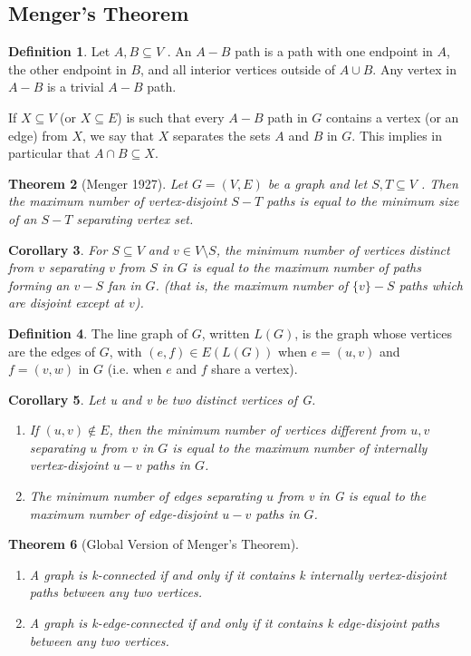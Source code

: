 \documentclass[11pt, fleqn, a4paper, landscape]{article}
\theoremstyle{plain} %
\newtheorem{thm}{Theorem}
\newtheorem{cor}[thm]{Corollary}
\theoremstyle{remark} %
\theoremstyle{definition} %
\newtheorem{defi}[thm]{Definition}
\begin{document}
\begin{multicols}{3}
\subsection{Menger’s Theorem}

\begin{defi}
Let $A,B \subseteq V$ . An $A-B$ path is a path with one endpoint in $A$, the other endpoint in $B$, and all interior vertices outside of $A \cup B$. Any vertex in $A - B$ is a trivial $A-B$ path.

If $X \subseteq V$ (or $X \subseteq E$) is such that every $A-B$ path in $G$ contains a vertex (or an edge) from $X$, we say that $X$ separates the sets $A$ and $B$ in $G$. This implies in particular that $A \cap B \subseteq X$.
\end{defi}
\begin{thm}[Menger 1927]
Let $G = (V,E)$ be a graph and let $S, T \subseteq V$ . Then the maximum
number of vertex-disjoint $S-T$ paths is equal to the minimum size of an $S-T$ separating vertex set.
\end{thm}

\begin{cor}
For $S \subseteq V$ and $v\in V \setminus S$, the minimum number of vertices distinct from $v$ separating $v$ from $S$ in $G$ is equal to the maximum number of paths forming an $v-S$ fan in $G$. (that is, the maximum number of $\{v\}-S$ paths which are disjoint except at $v$).
\end{cor}

\begin{defi}
The line graph of $G$, written $L(G)$, is the graph whose vertices are the edges of $G$, with $(e, f) \in E(L(G))$ when $e = (u, v)$ and $f = (v,w)$ in $G$ (i.e. when $e$ and $f$ share a vertex).
\end{defi}
\addtocounter{thm}{1}
\begin{cor}
Let u and v be two distinct vertices of G.
\begin{enumerate}
\item If $(u, v) \notin E$, then the minimum number of vertices different from $u, v$ separating $u$ from $v$ in $G$ is equal to the maximum number of internally vertex-disjoint $u-v$ paths in $G$.
\item The minimum number of edges separating $u$ from v in G is equal to the maximum number of edge-disjoint $u-v$ paths in $G$.
\end{enumerate}
\end{cor}

\begin{thm}[Global Version of Menger’s Theorem]
\begin{enumerate}
\item A graph is k-connected if and only if it contains k internally vertex-disjoint paths between any
two vertices.
\item A graph is k-edge-connected if and only if it contains k edge-disjoint paths between any two
vertices.
\end{enumerate}
\end{thm}


\end{multicols}
\end{document}
